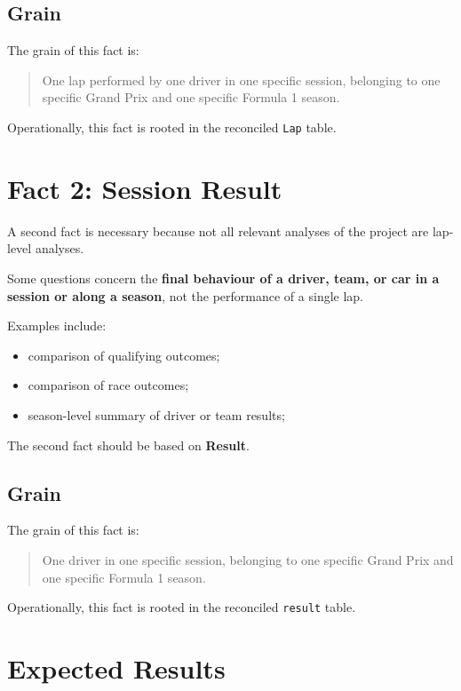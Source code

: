 \documentclass[a4paper,11pt]{article}
\begin{document}
	\subsection{Grain}
	
	The grain of this fact is:
	\begin{quote}
		One lap performed by one driver in one specific session, belonging to one specific Grand Prix and one specific Formula 1 season.
	\end{quote}
	
	Operationally, this fact is rooted in the reconciled \texttt{Lap} table.
	
	
	\section{Fact 2: Session Result}
	
	A second fact is necessary because not all relevant analyses of the project are lap-level analyses.
	
	Some questions concern the \textbf{final behaviour of a driver, team, or car in a session or along a season}, not the performance of a single lap.
	
	Examples include:
	\begin{itemize}[leftmargin=1.5em]
		\item comparison of qualifying outcomes;
		\item comparison of race outcomes;
		\item season-level summary of driver or team results;
	\end{itemize}
	

	
	The second fact should be based on \textbf{Result}.
	
	\subsection{Grain}
	
	The grain of this fact is:
	\begin{quote}
		One driver in one specific session, belonging to one specific Grand Prix and one specific Formula 1 season.
	\end{quote}
	
	Operationally, this fact is rooted in the reconciled \texttt{result} table.
	
	\section{Expected Results}
	
\end{document}
